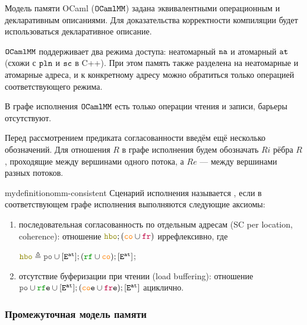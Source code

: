 Модель памяти OCaml ($\mathtt{OCaml}\allowbreak \mathtt{MM}$) \cite{omm} задана эквивалентными операционным и декларативным описаниями. Для доказательства корректности компиляции будет использоваться декларативное описание.

$\mathtt{OCaml}\allowbreak \mathtt{MM}$ поддерживает два режима доступа: неатомарный ${\mathtt{na}}$ и атомарный ${\mathtt{at}}$ (схожи с $\mathtt{pln}$ и ${\mathtt{sc}}$ в C++). При этом память также разделена на неатомарные и атомарные адреса, и к конкретному адресу можно обратиться только операцией соответствующего режима.

В графе исполнения $\mathtt{OCaml}\allowbreak \mathtt{MM}$ есть только операции чтения и записи, барьеры отсутствуют.

Перед рассмотрением предиката согласованности введём ещё несколько обозначений. Для отношения $R$ в графе исполнения будем обозначать $Ri$ рёбра $R$, проходящие между вершинами одного потока, а $Re$ --- между вершинами разных потоков. 

\begin{restatable}{mydefinition}{omm-consistent}
  Сценарий исполнения называется , если в соответствующем графе исполнения выполняются следующие аксиомы:

  \begin{enumerate}
  \item последовательная согласованность по отдельным адресам (SC per location, coherence): отношение $\lHBO ; (\lCO \cup \lFR)$ иррефлексивно, где

    $\lHBO \defeq \lPO \cup [\lE^{\at}] ; (\lRF \cup \lCO) ; [\lE^{\at}]$;
    
  \item отсутствие буферизации при чтении (load buffering): отношение $\lPO \cup \lRFE \cup [\lE^{\at}] ; (\lCOE \cup \lFRE) ; [\lE^{\at}]$ ациклично.
  \end{enumerate}
\end{restatable}

\subsubsection{Промежуточная модель памяти}



